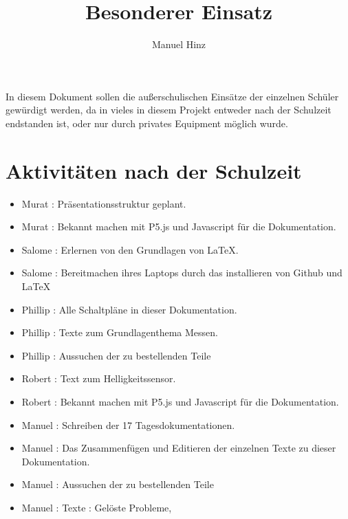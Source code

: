 \documentclass{article}
\author{Manuel Hinz}
\title{Besonderer Einsatz}
\begin{document}
\maketitle

In diesem Dokument sollen die außerschulischen Einsätze der einzelnen Schüler gewürdigt werden, da in vieles in diesem Projekt entweder nach der Schulzeit endstanden ist, oder nur durch privates Equipment möglich wurde.


\section{Aktivitäten nach der Schulzeit}

\begin{itemize}

\item Murat : Präsentationsstruktur geplant.

\item Murat : Bekannt machen mit P5.js und Javascript für die Dokumentation.

\item Salome : Erlernen von den Grundlagen von \LaTeX .

\item Salome : Bereitmachen ihres Laptops durch das installieren  von Github und \LaTeX

\item Phillip : Alle Schaltpläne in dieser Dokumentation.

\item Phillip : Texte zum Grundlagenthema Messen.

\item Phillip : Aussuchen der zu bestellenden Teile

\item Robert : Text zum Helligkeitssensor.

\item Robert : Bekannt machen mit P5.js und Javascript für die Dokumentation.


\item Manuel : Schreiben der 17 Tagesdokumentationen.

\item Manuel : Das Zusammenfügen und Editieren der einzelnen Texte zu dieser Dokumentation.

\item Manuel : Aussuchen der zu bestellenden Teile

\item Manuel : Texte :  Gelöste Probleme,  

\end{itemize}
\end{document}
